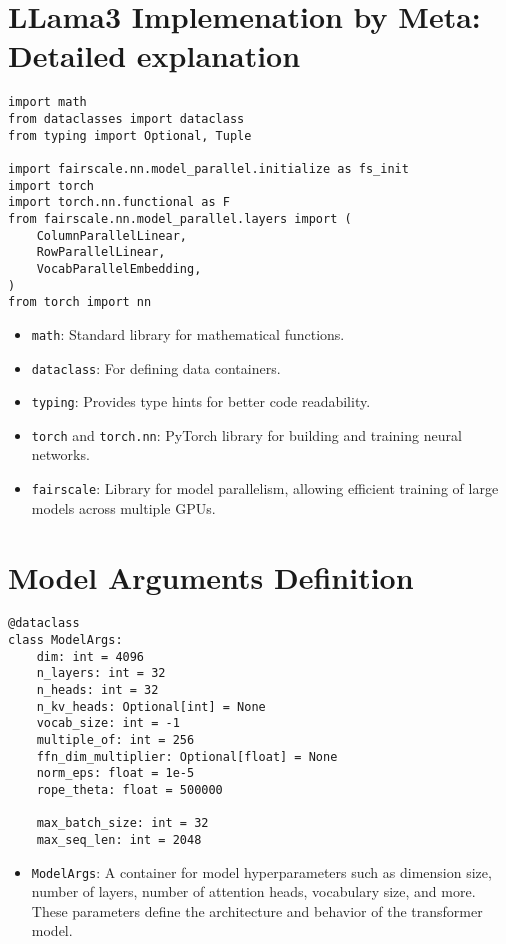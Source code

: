 \section{LLama3 Implemenation by Meta: Detailed explanation}


\begin{lstlisting}
import math
from dataclasses import dataclass
from typing import Optional, Tuple

import fairscale.nn.model_parallel.initialize as fs_init
import torch
import torch.nn.functional as F
from fairscale.nn.model_parallel.layers import (
    ColumnParallelLinear,
    RowParallelLinear,
    VocabParallelEmbedding,
)
from torch import nn
\end{lstlisting}

\begin{itemize}
    \item \texttt{math}: Standard library for mathematical functions.
    \item \texttt{dataclass}: For defining data containers.
    \item \texttt{typing}: Provides type hints for better code readability.
    \item \texttt{torch} and \texttt{torch.nn}: PyTorch library for building and training neural networks.
    \item \texttt{fairscale}: Library for model parallelism, allowing efficient training of large models across multiple GPUs.
\end{itemize}

\section{Model Arguments Definition}

\begin{lstlisting}
@dataclass
class ModelArgs:
    dim: int = 4096
    n_layers: int = 32
    n_heads: int = 32
    n_kv_heads: Optional[int] = None
    vocab_size: int = -1
    multiple_of: int = 256
    ffn_dim_multiplier: Optional[float] = None
    norm_eps: float = 1e-5
    rope_theta: float = 500000

    max_batch_size: int = 32
    max_seq_len: int = 2048
\end{lstlisting}

\begin{itemize}
    \item \texttt{ModelArgs}: A container for model hyperparameters such as dimension size, number of layers, number of attention heads, vocabulary size, and more. These parameters define the architecture and behavior of the transformer model.
\end{itemize}

